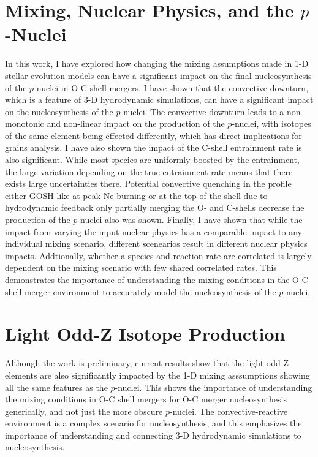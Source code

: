\label{concl}

\section{Mixing, Nuclear Physics, and the \texorpdfstring{$p$}{p}-Nuclei}\label{sec:mixing_nuclear_pnuclei
}

In this work, I have explored how changing the mixing assumptions made in 1-D stellar evolution models can have a significant impact on the final nucleosynthesis of the $p$-nuclei in O-C shell mergers.
I have shown that the convective downturn, which is a feature of 3-D hydrodynamic simulations, can have a significant impact on the nucleosynthesis of the $p$-nuclei.
The convective downturn leads to a non-monotonic and non-linear impact on the production of the $p$-nuclei, with isotopes of the same element being effected differently, which has direct implications for grains analysis.
I have also shown the impact of the C-shell entrainment rate is also significant.
While most species are uniformly boosted by the entrainment, the large variation depending on the true entrainment rate means that there exists large uncertainties there.
Potential convective quenching in the profile either GOSH-like at peak Ne-burning or at the top of the shell due to hydrodynamic feedback only partially merging the O- and C-shells decrease the production of the $p$-nuclei also was shown.
Finally, I have shown that while the impact from varying the input nuclear physics has a comparable impact to any individual mixing scenario, different scenearios result in different nuclear physics impacts.
Addtionally, whether a species and reaction rate are correlated is largely dependent on the mixing scenario with few shared correlated rates.
This demonstrates the importance of understanding the mixing conditions in the O-C shell merger environment to accurately model the nucleosynthesis of the $p$-nuclei.

\section{Light Odd-Z Isotope Production}\label{sec:lightoddZ}

Although the work is preliminary, current results show that the light odd-Z elements are also significantly impacted by the 1-D mixing asssumptions showing all the same features as the $p$-nuclei.
This shows the importance of understanding the mixing conditions in O-C shell mergers for O-C merger nucleosynthesis generically, and not just the more obscure $p$-nuclei.
The convective-reactive environment is a complex scenario for nucleosynthesis, and this emphasizes the importance of understanding and connecting 3-D hydrodynamic simulations to nucleosynthesis.

